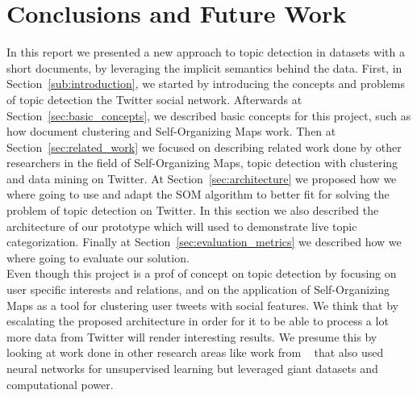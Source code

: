 
\section{Conclusions and Future Work} %
\label{sec:coclusions_future_work}

In this report we presented a new approach to topic detection in datasets with a short documents, by leveraging the implicit semantics behind the data. 
First, in Section~\ref{sub:introduction}, we started by introducing the concepts and problems of topic detection the Twitter social network. Afterwards at Section~\ref{sec:basic_concepts}, we described basic concepts for this project, such as how document clustering and Self-Organizing Maps work.
Then at Section~\ref{sec:related_work} we focused on describing related work done by other researchers in the field of Self-Organizing Maps, topic detection with clustering and data mining on Twitter. At Section~\ref{sec:architecture} we proposed how we where going to use and adapt the SOM algorithm to better fit for solving the problem of topic detection on Twitter. In this section we also described the architecture of our prototype which will used to demonstrate live topic categorization. Finally at Section~\ref{sec:evaluation_metrics} we described how we where going to evaluate our solution.
\\
Even though this project is a prof of concept on topic detection by focusing on user specific interests and relations, and on the application of Self-Organizing Maps as a tool for clustering user tweets with social features. We think that by escalating the proposed architecture in order for it to be able to process a lot more data from Twitter will render interesting results. We presume this by looking at work done in other research areas like work from ~\citet{Le2011} that also used neural networks for unsupervised learning but leveraged giant datasets and computational power. 

